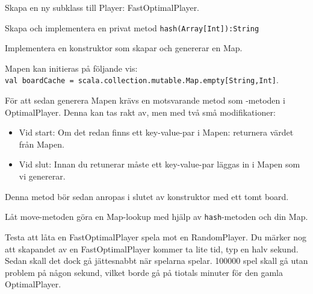 \Subtask Skapa en ny subklass till Player: FastOptimalPlayer.

\Subtask Skapa och implementera en privat metod \texttt{hash(Array[Int]):String}

\Subtask Implementera en konstruktor som skapar och genererar en Map.

Mapen kan initieras på följande vis: \\\texttt{val boardCache = scala.collection.mutable.Map.empty[String,Int]}.

För att sedan generera Mapen krävs en motsvarande metod som -metoden i OptimalPlayer. Denna kan tas rakt av, men med två små modifikationer:
\begin{itemize}
\item Vid start: Om det redan finns ett key-value-par i Mapen: returnera värdet från Mapen. 
\item Vid slut: Innan du retunerar måste ett key-value-par läggas in i Mapen som vi genererar.
\end{itemize}
Denna metod bör sedan anropas i slutet av konstruktor med ett tomt board.


\Subtask Låt move-metoden göra en Map-lookup med hjälp av \texttt{hash}-metoden och din Map.

\Subtask Testa att låta en FastOptimalPlayer spela mot en RandomPlayer. Du märker nog att skapandet av en FastOptimalPlayer kommer ta lite tid, typ en halv sekund. Sedan skall det dock gå jättesnabbt när spelarna spelar. 100000 spel skall gå utan problem på någon sekund, vilket borde gå på tiotals minuter för den gamla OptimalPlayer.